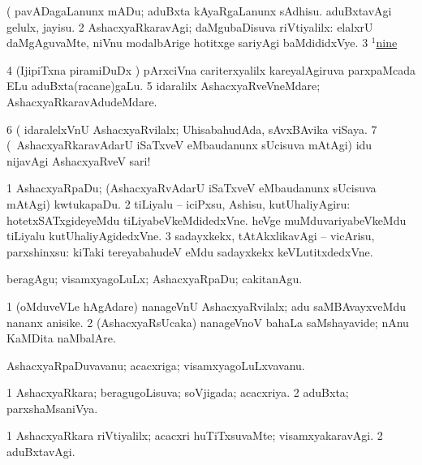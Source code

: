 \noindent
\gl{\pagu}
\expl{}
\bmng
\bnum
{}  (  
\banum
{} pavADagaLanunx mADu; aduBxta kAyaRgaLanunx sAdhisu. 
 aduBxtavAgi gelulx, jayisu. 
\eanum
\numie
\num{2}  AshacxyaRkaravAgi; daMgubaDisuva riVtiyalilx:  elalxrU daMgAguvaMte, niVnu modalbArige hotitxge sariyAgi baMdididxVye. 
\num{3} \hyperref{kandict_n.pdf}{N}{nine(1) pagu(3)}{$^1$nine}  
\num{4}  (IjipiTxna piramiDuDx \mo) pArxciVna cariterxyalilx kareyalAgiruva parxpaMcada ELu aduBxta(racane)gaLu. 
\num{5}  idaralilx AshacxyaRveVneMdare; AshacxyaRkaravAdudeMdare. 
\num{6}  (  idaralelxVnU AshacxyaRvilalx; UhisabahudAda, sAvxBAvika viSaya. 
\num{7}  (\sA\ AshacxyaRkaravAdarU iSaTxveV eMbaudanunx sUcisuva mAtAgi) idu nijavAgi AshacxyaRveV sari! 
\enum
\emng
\eentry

\bentry
{} 
\gl{\sakirx}
\expl{}
\bmng
\bnum
\num{1} AshacxyaRpaDu; (AshacxyaRvAdarU iSaTxveV eMbaudanunx sUcisuva mAtAgi) kwtukapaDu. 
\num{2} tiLiyalu -- iciPxsu, Ashisu, kutUhaliyAgiru:  hotetxSATxgideyeMdu tiLiyabeVkeMdidedxVne.  heVge muMduvariyabeVkeMdu tiLiyalu kutUhaliyAgidedxVne. 
\num{3} sadayxkekx, tAtAkxlikavAgi -- vicArisu, parxshinxsu:  kiTaki tereyabahudeV eMdu sadayxkekx keVLutitxdedxVne. 
\enum
\emng

\noindent 
\gl{\akirx}
\expl{}
\bmng
beragAgu; visamxyagoLuLx; AshacxyaRpaDu; cakitanAgu. 
\emng

\noindent
\gl{\pagu}
\expl{}
\bmng
\bnum
\num{1}  (oMduveVLe hAgAdare) nanageVnU AshacxyaRvilalx; adu saMBAvayxveMdu nananx anisike. 
\num{2}  (AshacxyaRsUcaka) nanageVnoV bahaLa saMshayavide; nAnu KaMDita naMbalAre. 
\enum
\emng
\eentry

\bentry
{} 
\gl{\nA}
\expl{}
\bmng
AshacxyaRpaDuvavanu; acacxriga; visamxyagoLuLxvavanu. 
\emng
\eentry

\bentry
{} 
\gl{\gu}
\expl{}
\bmng
\bnum
\num{1} AshacxyaRkara; beragugoLisuva; soVjigada; acacxriya. 
\num{2} aduBxta; parxshaMsaniVya. 
\enum
\emng
\eentry

\bentry
{} 
\gl{\kirxvi}
\expl{}
\bmng
\bnum
\num{1} AshacxyaRkara riVtiyalilx; acacxri huTiTxsuvaMte; visamxyakaravAgi. 
\num{2} aduBxtavAgi. 
\enum
\emng
\eentry

